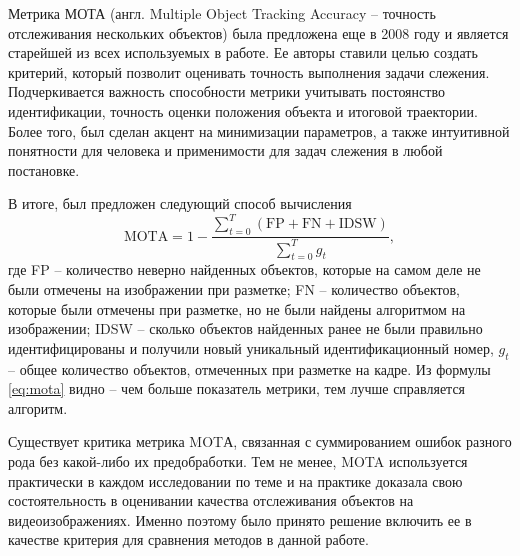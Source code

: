 Метрика МОТА\cite{bernardin2008evaluating} (англ. Multiple Object Tracking Accuracy -- точность отслеживания нескольких объектов) была предложена еще в 2008 году и является старейшей из всех используемых в работе. 
Ее авторы ставили целью создать критерий, который позволит оценивать точность выполнения задачи слежения. 
Подчеркивается важность способности метрики учитывать постоянство идентификации, точность оценки положения объекта и итоговой траектории.
Более того, был сделан акцент на минимизации параметров, а также интуитивной понятности для человека и применимости для задач слежения в любой постановке.

В итоге, был предложен следующий способ вычисления 
\begin{equation}
    \text{MOTA} = 1 - \frac{\sum_{t=0}^{T}(\text{FP} + \text{FN} + \text{IDSW})}{\sum_{t=0}^{T}g_t},
    \label{eq:mota}
\end{equation}
где FP -- количество неверно найденных объектов, которые на самом деле не были отмечены на изображении при разметке; FN -- количество объектов, которые были отмечены при разметке, но не были найдены алгоритмом на изображении; IDSW -- сколько объектов найденных ранее не были правильно идентифицированы и получили новый уникальный идентификационный номер, \(g_t\) -- общее количество объектов, отмеченных при разметке на кадре.
Из формулы \ref{eq:mota} видно -- чем больше показатель метрики, тем лучше справляется алгоритм.

Существует критика метрика MOTА, связанная с суммированием ошибок разного рода без какой-либо их предобработки. Тем не менее, MOTA используется практически в каждом исследовании по теме и на практике доказала свою состоятельность в оценивании качества отслеживания объектов на видеоизображениях. Именно поэтому было принято решение включить ее в качестве критерия для сравнения методов в данной работе.
